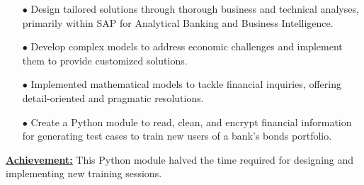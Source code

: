 \begin{itemize}[leftmargin=5mm]
          \begin{itemize}[leftmargin=0mm]
              \small

              \item[$\bullet$] Design tailored solutions through thorough business and technical analyses, primarily within SAP for Analytical Banking and Business Intelligence.
              \item[$\bullet$] Develop complex models to address economic challenges and implement them to provide customized solutions.
              \item[$\bullet$] Implemented mathematical models to tackle financial inquiries, offering detail-oriented and pragmatic resolutions.
              \item[$\bullet$] Create a Python module to read, clean, and encrypt financial information for generating test cases to train new users of a bank's bonds portfolio.
          \end{itemize}

          \textbf{\href{.}{\underline{Achievement:}}}
          This Python module halved the time required for designing and implementing new training sessions.





\end{itemize}
